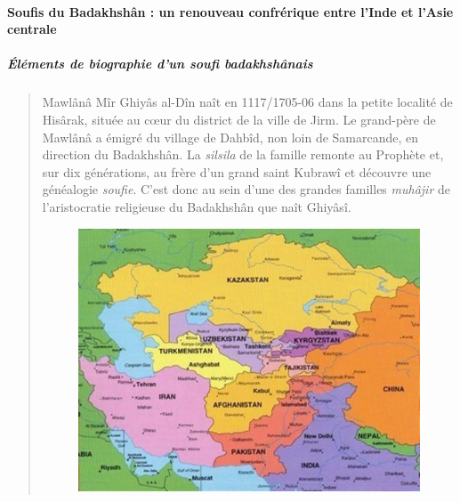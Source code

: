 
 



 



\paragraph{Soufis du Badakhshân : un renouveau confrérique entre
l'Inde et l'Asie centrale}
 
 
\subparagraph{Éléments de biographie d'un soufi
badakhshânais} 
\begin{quote}
Mawlânâ Mîr Ghiyâs al-Dîn \label{Theo:MawlanaMirGhiyasAlDin} naît en 1117/1705-06 dans la petite localité
de Hisârak, située au cœur du district de la ville de Jirm. Le
grand-père de Mawlânâ a émigré du village de Dahbîd, non loin de
Samarcande, en direction du Badakhshân. La \emph{silsila} de la famille
remonte au Prophète et, sur dix générations, au frère d'un grand saint
Kubrawî et découvre une généalogie \textit{soufie}. C'est donc au sein d'une des
grandes familles \emph{muhâjir} de l'aristocratie religieuse du
Badakhshân que naît Ghiyâsî.
\begin{figure}[h!]
    \centering
 \includegraphics[width=\textwidth]{CourantsIslamContemporain/ImagesCourantsIslamContemporain/AsieCentrale.jpg}
 

\end{figure}
\end{quote}
